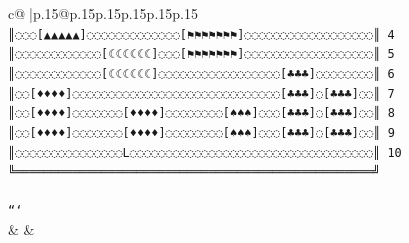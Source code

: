 \documentclass{article}
\begin{document}
{\begin{supertabular}{c@{$\;$}|p{.15\linewidth}@{}p{.15\linewidth}p{.15\linewidth}p{.15\linewidth}p{.15\linewidth}p{.15\linewidth}}
{{{\texttt{║◌◌◌{[}▲▲▲▲▲{]}◌◌◌◌◌◌◌◌◌◌◌◌◌{[}⚑⚑⚑⚑⚑⚑⚑{]}◌◌◌◌◌◌◌◌◌◌◌◌◌◌◌◌◌◌║ 4} \\
\texttt{║◌◌◌◌◌◌◌◌◌◌◌◌{[}☾☾☾☾☾☾{]}◌◌◌{[}⚑⚑⚑⚑⚑⚑⚑{]}◌◌◌◌◌◌◌◌◌◌◌◌◌◌◌◌◌◌║ 5} \\
\texttt{║◌◌◌◌◌◌◌◌◌◌◌◌{[}☾☾☾☾☾☾{]}◌◌◌◌◌◌◌◌◌◌◌◌◌◌◌◌◌{[}♣♣♣{]}◌◌◌◌◌◌◌◌║ 6} \\
\texttt{║◌◌{[}♦♦♦♦{]}◌◌◌◌◌◌◌◌◌◌◌◌◌◌◌◌◌◌◌◌◌◌◌◌◌◌◌◌◌{[}♣♣♣{]}◌{[}♣♣♣{]}◌◌║ 7} \\
\texttt{║◌◌{[}♦♦♦♦{]}◌◌◌◌◌◌◌{[}♦♦♦♦{]}◌◌◌◌◌◌◌◌{[}♠♠♠{]}◌◌◌{[}♣♣♣{]}◌{[}♣♣♣{]}◌◌║ 8} \\
\texttt{║◌◌{[}♦♦♦♦{]}◌◌◌◌◌◌◌{[}♦♦♦♦{]}◌◌◌◌◌◌◌◌{[}♠♠♠{]}◌◌◌{[}♣♣♣{]}◌{[}♣♣♣{]}◌◌║ 9} \\
\texttt{║◌◌◌◌◌◌◌◌◌◌◌◌◌◌◌L◌◌◌◌◌◌◌◌◌◌◌◌◌◌◌◌◌◌◌◌◌◌◌◌◌◌◌◌◌◌◌◌◌◌║ 10} \\
\texttt{╚══════════════════════════════════════════════════╝} \\
\\ 
\texttt{```} \\
            }
        }
    }
    & & \\ \\


\end{supertabular}}
\end{document}
